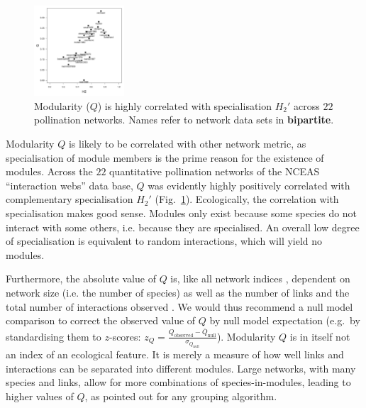 \documentclass[a4paper, 11pt]{article}\usepackage[]{graphicx}\usepackage[]{color}
\newcommand{\package}[1]{\textbf{#1}}
\begin{document}
\begin{figure}
	\vspace*{-.5cm}
	\includegraphics[width=0.3\textwidth]{figures/poll_mod_QvsH2}
	\caption{Modularity ($Q$) is highly correlated with specialisation $H_2'$ across $22$ pollination networks. Names refer to network data sets in \package{bipartite}.}
\label{fig:QvsH2}
\end{figure}
%
Modularity $Q$ is likely to be correlated with other network metric, as specialisation of module members is the prime reason for the existence of modules. Across the $22$ quantitative pollination networks of the NCEAS ``interaction webs'' data base,%
 $Q$ was evidently highly positively correlated with complementary specialisation $H_2'$ (Fig.~\ref{fig:QvsH2}).
Ecologically, the correlation with specialisation makes good sense. Modules only exist because some species do not interact with some others, i.e. because they are specialised. An overall low degree of specialisation is equivalent to random interactions, which will yield no modules. %

Furthermore, the absolute value of $Q$  is, like all network indices \citep{Dormann2009}, dependent on network size (i.e. the number of species) as well as the number of links and the total number of interactions observed \citep{Thebault2013}. We would thus recommend a null model comparison \citep{Vazquez2003a,Bluthgen2008,Dormann2009} to correct the observed value of $Q$ by null model expectation (e.g.~by standardising them to $z$-scores:
$z_{Q} = \frac{Q_{\text{observed}} - \overline{Q}_{\text{null}}}{\sigma_{Q_{\text{null}}}}$).
%
Modularity $Q$ is in itself not an index of an ecological feature. It is merely a measure of how well links and interactions can be separated into different modules. Large networks, with many species and links, allow for more combinations of species-in-modules, leading to higher values of $Q$, as \citet{Allesina2009a} pointed out for any grouping algorithm. %
\end{document}
